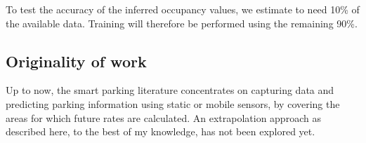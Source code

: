 \documentclass{article}
\begin{document}
\begin{large}
To test the accuracy of the inferred occupancy va\-lues, we estimate to need 10\% of the available data. Training will therefore be performed using the remaining 90\%.


\subsection{Originality of work} Up to now, the smart parking literature concentrates on capturing data and predicting parking information using static or mobile sensors, by covering the areas for which future rates are calculated\cite{lin}. An extrapolation approach as described here, to the best of my knowledge, has not been explored yet.

\end{large}

\nocite{*}

\printbibliography
\end{document}
